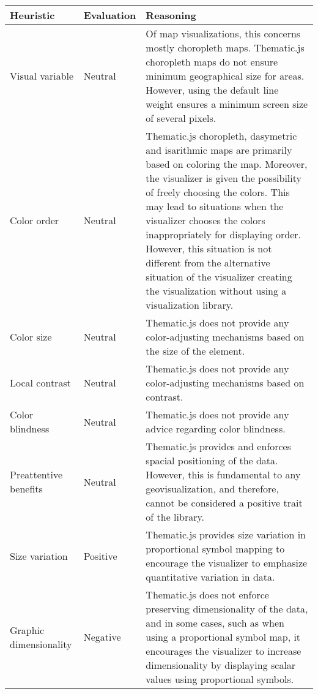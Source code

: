 \begin{longtable}{|p{3cm}|p{2.2cm}|p{7.8cm}|}
\hline
\textbf{Heuristic} & \textbf{Evaluation} & \textbf{Reasoning} \\
\hline
\endhead
\hline
\endfoot
\endlastfoot
Visual variable & Neutral & Of map visualizations, this concerns mostly choropleth maps. Thematic.js choropleth maps do not ensure minimum geographical size for areas. However, using the default line weight ensures a minimum screen size of several pixels. \\[0.5em] %
Color order & Neutral & Thematic.js choropleth, dasymetric and isarithmic maps are primarily based on coloring the map. Moreover, the visualizer is given the possibility of freely choosing the colors. This may lead to situations when the visualizer chooses the colors inappropriately for displaying order. However, this situation is not different from the alternative situation of the visualizer creating the visualization without using a visualization library. \\[0.5em] %
Color size & Neutral & Thematic.js does not provide any color-adjusting mechanisms based on the size of the element. \\[0.5em] %
Local contrast & Neutral & Thematic.js does not provide any color-adjusting mechanisms based on contrast. \\[0.5em] %
Color blindness & Neutral & Thematic.js does not provide any advice regarding color blindness. \\[0.5em] %
Preattentive benefits & Neutral & Thematic.js provides and enforces spacial positioning of the data. However, this is fundamental to any geovisualization, and therefore, cannot be considered a positive trait of the library. \\[0.5em] %
Size variation & Positive & Thematic.js provides size variation in proportional symbol mapping to encourage the visualizer to emphasize quantitative variation in data. \\[0.5em] %
Graphic dimensionality & Negative & Thematic.js does not enforce preserving dimensionality of the data, and in some cases, such as when using a proportional symbol map, it encourages the visualizer to increase dimensionality by displaying scalar values using proportional symbols. \\[0.5em] %

\end{longtable}
